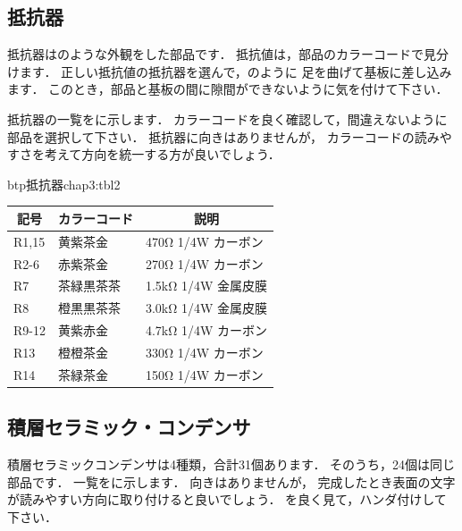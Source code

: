 %

\subsection{抵抗器}

抵抗器はのような外観をした部品です．
抵抗値は，部品のカラーコードで見分けます．
正しい抵抗値の抵抗器を選んで，のように
足を曲げて基板に差し込みます．
このとき，部品と基板の間に隙間ができないように気を付けて下さい．

抵抗器の一覧をに示します．
カラーコードを良く確認して，間違えないように部品を選択して下さい．
抵抗器に向きはありませんが，
カラーコードの読みやすさを考えて方向を統一する方が良いでしょう．


\begin{mytable}{btp}{抵抗器}{chap3:tbl2}
{\small\begin{tabular}{l|l|l}
\hline
\hline
\multicolumn{1}{c|}{記号} &
\multicolumn{1}{c|}{カラーコード} &
\multicolumn{1}{c}{説明} \\
\hline
R1,15 & 黄紫茶金   & 470Ω  1/4W カーボン \\
R2-6  & 赤紫茶金   & 270Ω  1/4W カーボン \\
R7    & 茶緑黒茶茶 & 1.5kΩ 1/4W 金属皮膜 \\
R8    & 橙黒黒茶茶 & 3.0kΩ 1/4W 金属皮膜 \\
R9-12 & 黄紫赤金   & 4.7kΩ 1/4W カーボン \\
R13   & 橙橙茶金   & 330Ω  1/4W カーボン \\
R14   & 茶緑茶金   & 150Ω  1/4W カーボン \\
\end{tabular}}
\end{mytable}

\subsection{積層セラミック・コンデンサ}
積層セラミックコンデンサは4種類，合計31個あります．
そのうち，24個は同じ部品です．
一覧をに示します．
向きはありませんが，
完成したとき表面の文字が読みやすい方向に取り付けると良いでしょう．
を良く見て，ハンダ付けして下さい．

